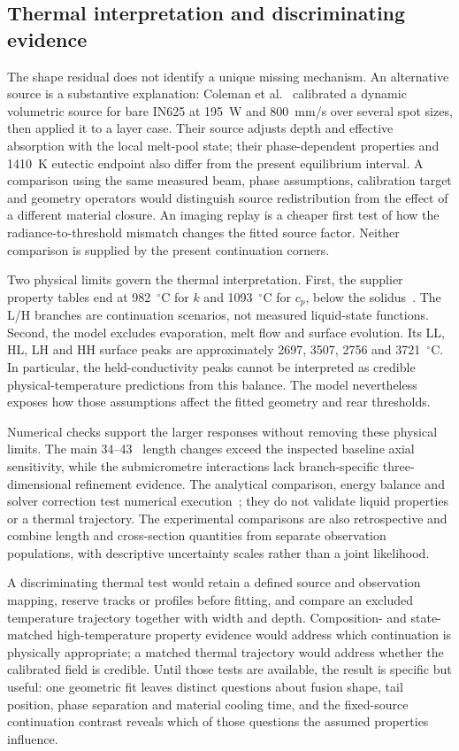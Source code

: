 \subsection{Thermal interpretation and discriminating evidence}
The shape residual does not identify a unique missing mechanism. An alternative source is a substantive explanation: Coleman et al.~\cite{dynamic2024} calibrated a dynamic volumetric source for bare IN625 at 195~W and 800~mm/s over several spot sizes, then applied it to a layer case. Their source adjusts depth and effective absorption with the local melt-pool state; their phase-dependent properties and 1410~K eutectic endpoint also differ from the present equilibrium interval. A comparison using the same measured beam, phase assumptions, calibration target and geometry operators would distinguish source redistribution from the effect of a different material closure. An imaging replay is a cheaper first test of how the radiance-to-threshold mismatch changes the fitted source factor. Neither comparison is supplied by the present continuation corners.

Two physical limits govern the thermal interpretation. First, the supplier property tables end at 982~$^\circ$C for $k$ and 1093~$^\circ$C for $c_p$, below the solidus~\cite{specialmetals625}. The L/H branches are continuation scenarios, not measured liquid-state functions. Second, the model excludes evaporation, melt flow and surface evolution. Its LL, HL, LH and HH surface peaks are approximately 2697, 3507, 2756 and 3721~$^\circ$C. In particular, the held-conductivity peaks cannot be interpreted as credible physical-temperature predictions from this balance. The model nevertheless exposes how those assumptions affect the fitted geometry and rear thresholds.

Numerical checks support the larger responses without removing these physical limits. The main 34--43~\um{} length changes exceed the inspected baseline axial sensitivity, while the submicrometre interactions lack branch-specific three-dimensional refinement evidence. The analytical comparison, energy balance and solver correction test numerical execution~\cite{oberkampf2002}; they do not validate liquid properties or a thermal trajectory. The experimental comparisons are also retrospective and combine length and cross-section quantities from separate observation populations, with descriptive uncertainty scales rather than a joint likelihood.

A discriminating thermal test would retain a defined source and observation mapping, reserve tracks or profiles before fitting, and compare an excluded temperature trajectory together with width and depth. Composition- and state-matched high-temperature property evidence would address which continuation is physically appropriate; a matched thermal trajectory would address whether the calibrated field is credible. Until those tests are available, the result is specific but useful: one geometric fit leaves distinct questions about fusion shape, tail position, phase separation and material cooling time, and the fixed-source continuation contrast reveals which of those questions the assumed properties influence.
